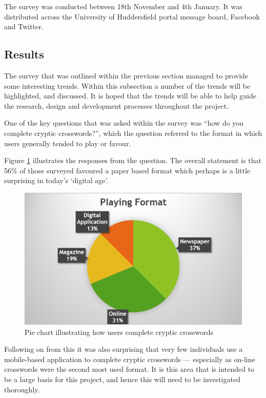 The survey was conducted between 18th November and 4th January. It was 
distributed across the University of Huddersfield portal message board,
Facebook and Twitter.


\subsection{Results}

The survey that was outlined within the previous section managed to provide some
interesting trends. Within this subsection a number of the trends will be 
highlighted, and discussed. It is hoped that the trends will be able to help 
guide the research, design and development processes throughout the project.

One of the key questions that was asked within the survey was ``how do you 
complete cryptic crosswords?'', which the question referred to the format in 
which users generally tended to play or favour. 

Figure \ref{fig:playing_format} illustrates the responses from the question. The
overall statement is that 56\% of those surveyed favoured a paper based format
which perhaps is a little surprising in today's `digital age'.

\begin{figure}[H]
  \centering
  \includegraphics[scale=0.9]{graphs/playing_format.png}
  \caption{Pie chart illustrating how users complete cryptic crosswords}
  \label{fig:playing_format}
\end{figure}

Following on from this it was also surprising that very few individuals use a 
mobile-based application to complete cryptic crosswords --- especially as 
on-line crosswords were the second most used format. It is this area that is
intended to be a large basis for this project, and hence this will need to be
investigated thoroughly.

